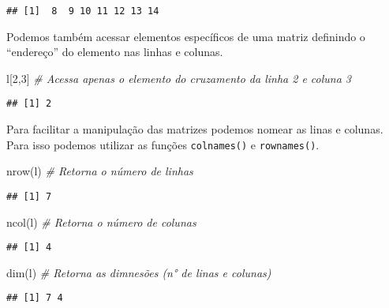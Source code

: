 \documentclass[
]{book}
\newenvironment{Shaded}{\begin{snugshade}}{\end{snugshade}}
\newcommand{\CommentTok}[1]{\textcolor[rgb]{0.56,0.35,0.01}{\textit{#1}}}
\newcommand{\DecValTok}[1]{\textcolor[rgb]{0.00,0.00,0.81}{#1}}
\newcommand{\FunctionTok}[1]{\textcolor[rgb]{0.00,0.00,0.00}{#1}}
\newcommand{\NormalTok}[1]{#1}
\begin{document}
\begin{verbatim}
## [1]  8  9 10 11 12 13 14
\end{verbatim}

Podemos também acessar elementos específicos de uma matriz definindo o ``endereço'' do elemento nas linhas e colunas.

\begin{Shaded}
\begin{Highlighting}[]
\NormalTok{l[}\DecValTok{2}\NormalTok{,}\DecValTok{3}\NormalTok{] }\CommentTok{\# Acessa apenas o elemento do cruzamento da linha 2 e coluna 3}
\end{Highlighting}
\end{Shaded}

\begin{verbatim}
## [1] 2
\end{verbatim}

Para facilitar a manipulação das matrizes podemos nomear as linas e colunas. Para isso podemos utilizar as funções \texttt{colnames()} e \texttt{rownames()}.

\begin{Shaded}
\begin{Highlighting}[]
\FunctionTok{nrow}\NormalTok{(l) }\CommentTok{\# Retorna o número de linhas}
\end{Highlighting}
\end{Shaded}

\begin{verbatim}
## [1] 7
\end{verbatim}

\begin{Shaded}
\begin{Highlighting}[]
\FunctionTok{ncol}\NormalTok{(l) }\CommentTok{\# Retorna o número de colunas}
\end{Highlighting}
\end{Shaded}

\begin{verbatim}
## [1] 4
\end{verbatim}

\begin{Shaded}
\begin{Highlighting}[]
\FunctionTok{dim}\NormalTok{(l) }\CommentTok{\# Retorna as dimnesões (n° de linas e colunas)}
\end{Highlighting}
\end{Shaded}

\begin{verbatim}
## [1] 7 4
\end{verbatim}
\end{document}
